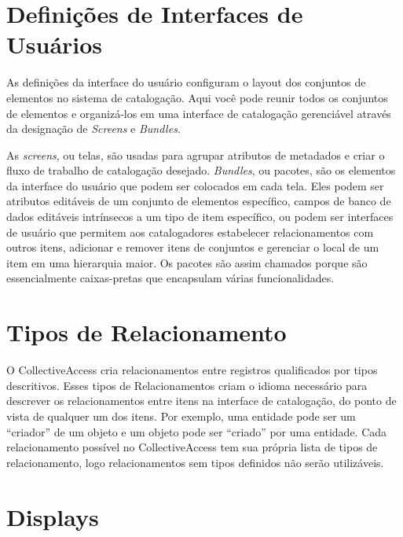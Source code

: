 \section{Definições de Interfaces de Usuários}

As definições da interface do usuário configuram o layout dos conjuntos de elementos no sistema de catalogação. Aqui você pode reunir todos os conjuntos de elementos e organizá-los em uma interface de catalogação gerenciável através da designação de \textit{Screens} e \textit{Bundles}.

As \textit{screens}, ou telas, são usadas para agrupar atributos de metadados e criar o fluxo de trabalho de catalogação desejado. \textit{Bundles}, ou pacotes, são os elementos da interface do usuário que podem ser colocados em cada tela. Eles podem ser atributos editáveis de um conjunto de elementos específico, campos de banco de dados editáveis intrínsecos a um tipo de item específico, ou podem ser interfaces de usuário que permitem aos catalogadores estabelecer relacionamentos com outros itens, adicionar e remover itens de conjuntos e gerenciar o local de um item em uma hierarquia maior. Os pacotes são assim chamados porque são essencialmente caixas-pretas que encapsulam várias funcionalidades.

\section{Tipos de Relacionamento}

O CollectiveAccess cria relacionamentos entre registros qualificados por tipos descritivos. Esses tipos de Relacionamentos criam o idioma necessário para descrever os relacionamentos entre itens na interface de catalogação, do ponto de vista de qualquer um dos itens. Por exemplo, uma entidade pode ser um “criador” de um objeto e um objeto pode ser “criado” por uma entidade. Cada relacionamento possível no CollectiveAccess tem sua própria lista de tipos de relacionamento, logo relacionamentos sem tipos definidos não serão utilizáveis.

\section{Displays}